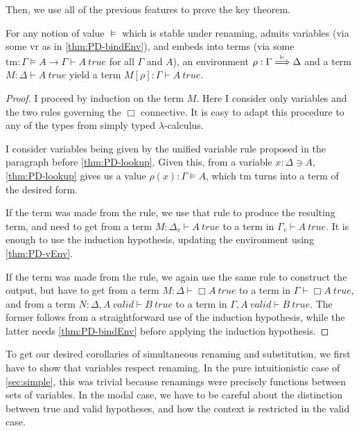 Then, we use all of the previous features to prove the key theorem.

\begin{theorem}[trav]\label{thm:PD-trav}
  For any notion of value $\vDash$ which is stable under renaming, admits
  variables (via some $\mathrm{vr}$ as in \cref{thm:PD-bindEnv}), and
  embeds into terms (via some
  $\mathrm{tm} : \Gamma \vDash A \to \Gamma \vdash A~\mathit{true}$ for all
  $\Gamma$ and $A$),
  an environment $\rho : \Gamma \stackrel{\vDash}\Longrightarrow \Delta$ and a term
  $M : \Delta \vdash A~\mathit{true}$ yield a term
  $M[\rho] : \Gamma \vdash A~\mathit{true}$.
\end{theorem}
\begin{proof}
  I proceed by induction on the term $M$.
  Here I consider only variables and the two rules governing the $\Box$
  connective.
  It is easy to adapt this procedure to any of the types from simply typed
  $\lambda$-calculus.

  I consider variables being given by the unified variable rule proposed in the
  paragraph before \cref{thm:PD-lookup}.
  Given this, from a variable $x : \Delta \ni A$, \cref{thm:PD-lookup} gives us
  a value $\rho(x) : \Gamma \vDash A$, which $\mathrm{tm}$ turns into a term of
  the desired form.

  If the term was made from the  rule, we use that rule to
  produce the resulting term, and need to get from a term
  $M : \Delta_v \vdash A~\mathit{true}$ to a term in
  $\Gamma_v \vdash A~\mathit{true}$.
  It is enough to use the induction hypothesis, updating the environment using
  \cref{thm:PD-vEnv}.

  If the term was made from the  rule, we again use the same
  rule to construct the output, but have to get from a term
  $M : \Delta \vdash \Box A~\mathit{true}$ to a term in
  $\Gamma \vdash \Box A~\mathit{true}$, and from a term
  $N : \Delta, A~\mathit{valid} \vdash B~\mathit{true}$ to a term in
  $\Gamma, A~\mathit{valid} \vdash B~\mathit{true}$.
  The former follows from a straightforward use of the induction hypothesis,
  while the latter needs \cref{thm:PD-bindEnv} before applying the induction
  hypothesis.
\end{proof}

To get our desired corollaries of simultaneous renaming and substitution, we
first have to show that variables respect renaming.
In the pure intuitionistic case of \cref{sec:simple}, this was trivial because
renamings were precisely functions between sets of variables.
In the modal case, we have to be careful about the distinction between true and
valid hypotheses, and how the context is restricted in the valid case.

